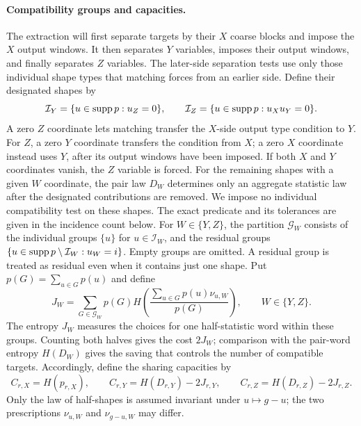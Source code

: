 \paragraph{Compatibility groups and capacities.}
The extraction will first separate targets by their $X$ coarse blocks
and impose the $X$ output windows.  It then separates $Y$ variables,
imposes their output windows, and finally separates $Z$ variables.
The later-side separation tests use only those individual shape types
that matching forces from an earlier side.  Define their designated
shapes by
\begin{equation}\label{eq:designated-compatibility}
 \mathcal I_Y=\{u\in\operatorname{supp} p:u_Z=0\},\qquad
 \mathcal I_Z=\{u\in\operatorname{supp} p:u_Xu_Y=0\}.
\end{equation}
A zero $Z$ coordinate lets matching transfer the $X$-side output
type condition to $Y$.  For $Z$, a zero
$Y$ coordinate transfers the condition from $X$; a zero $X$ coordinate
instead uses $Y$, after its output windows have been imposed.  If both
$X$ and $Y$ coordinates vanish, the $Z$ variable is forced.
For the remaining shapes with a given $W$ coordinate, the pair law
$D_W$ determines only an aggregate statistic law after the designated
contributions are removed.  We impose no individual compatibility
test on these shapes.  The exact predicate and its tolerances are
given in the incidence count below.
For $W\in\{Y,Z\}$, the partition $\mathcal G_W$ consists of the
individual groups $\{u\}$ for $u\in\mathcal I_W$, and the residual
groups $\{u\in\operatorname{supp} p\setminus\mathcal I_W:u_W=i\}$.
Empty groups are omitted.  A residual group is treated as residual
even when it contains just one shape.  Put $p(G)=\sum_{u\in G}p(u)$
and define
\begin{equation}\label{eq:joint-group-entropy}
 J_W=\sum_{G\in\mathcal G_W}p(G)
 H\left(\frac{\sum_{u\in G}p(u)\nu_{u,W}}{p(G)}\right),
 \qquad W\in\{Y,Z\}.
\end{equation}
The entropy $J_W$ measures the choices for one half-statistic word
within these groups.  Counting both halves gives the cost $2J_W$;
comparison with the pair-word entropy $H(D_W)$ gives the saving that
controls the number of compatible targets.  Accordingly, define the
sharing capacities by
\begin{equation}\label{eq:sharing-capacities}
 C_{r,X}=H(p_{r,X}),\qquad
 C_{r,Y}=H(D_{r,Y})-2J_{r,Y},\qquad
 C_{r,Z}=H(D_{r,Z})-2J_{r,Z}.
\end{equation}
Only the law of half-shapes is assumed invariant under $u\mapsto g-u$;
the two prescriptions $\nu_{u,W}$ and $\nu_{g-u,W}$ may differ.

